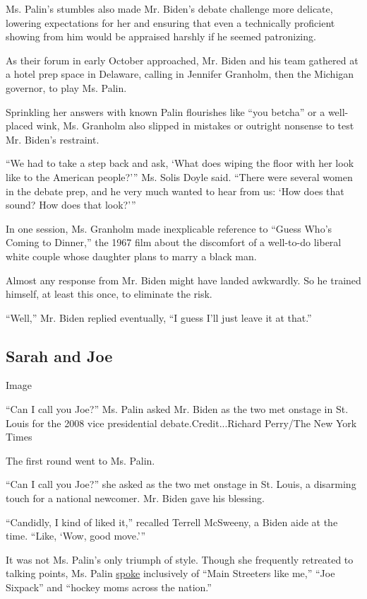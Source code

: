 Ms. Palin's stumbles also made Mr. Biden's debate challenge more
delicate, lowering expectations for her and ensuring that even a
technically proficient showing from him would be appraised harshly if he
seemed patronizing.

As their forum in early October approached, Mr. Biden and his team
gathered at a hotel prep space in Delaware, calling in Jennifer
Granholm, then the Michigan governor, to play Ms. Palin.

Sprinkling her answers with known Palin flourishes like ``you betcha''
or a well-placed wink, Ms. Granholm also slipped in mistakes or outright
nonsense to test Mr. Biden's restraint.

``We had to take a step back and ask, `What does wiping the floor with
her look like to the American people?''' Ms. Solis Doyle said. ``There
were several women in the debate prep, and he very much wanted to hear
from us: `How does that sound? How does that look?'''

In one session, Ms. Granholm made inexplicable reference to ``Guess
Who's Coming to Dinner,'' the 1967 film about the discomfort of a
well-to-do liberal white couple whose daughter plans to marry a black
man.

Almost any response from Mr. Biden might have landed awkwardly. So he
trained himself, at least this once, to eliminate the risk.

``Well,'' Mr. Biden replied eventually, ``I guess I'll just leave it at
that.''

\hypertarget{sarah-and-joe}{%
\subsection{Sarah and Joe}\label{sarah-and-joe}}

Image

``Can I call you Joe?'' Ms. Palin asked Mr. Biden as the two met onstage
in St. Louis for the 2008 vice presidential debate.Credit...Richard
Perry/The New York Times

The first round went to Ms. Palin.

``Can I call you Joe?'' she asked as the two met onstage in St. Louis, a
disarming touch for a national newcomer. Mr. Biden gave his blessing.

``Candidly, I kind of liked it,'' recalled Terrell McSweeny, a Biden
aide at the time. ``Like, `Wow, good move.'''

It was not Ms. Palin's only triumph of style. Though she frequently
retreated to talking points, Ms. Palin
\href{https://www.nytimes.com/elections/2008/president/debates/transcripts/vice-presidential-debate.html}{spoke}
inclusively of ``Main Streeters like me,'' ``Joe Sixpack'' and ``hockey
moms across the nation.''


